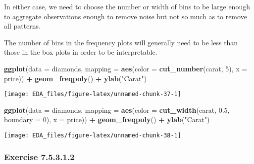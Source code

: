 \documentclass[]{book}
\newenvironment{Shaded}{\begin{snugshade}}{\end{snugshade}}
\newcommand{\DataTypeTok}[1]{\textcolor[rgb]{0.13,0.29,0.53}{#1}}
\newcommand{\DecValTok}[1]{\textcolor[rgb]{0.00,0.00,0.81}{#1}}
\newcommand{\FloatTok}[1]{\textcolor[rgb]{0.00,0.00,0.81}{#1}}
\newcommand{\KeywordTok}[1]{\textcolor[rgb]{0.13,0.29,0.53}{\textbf{#1}}}
\newcommand{\NormalTok}[1]{#1}
\newcommand{\OperatorTok}[1]{\textcolor[rgb]{0.81,0.36,0.00}{\textbf{#1}}}
\newcommand{\StringTok}[1]{\textcolor[rgb]{0.31,0.60,0.02}{#1}}
\theoremstyle{plain}
\theoremstyle{remark}
\begin{document}
In either case, we need to choose the number or width of bins to be
large enough to aggregate observations enough to remove noise but not so
much as to remove all patterns.

The number of bins in the frequency plots will generally need to be less
than those in the box plots in order to be interpretable.

\begin{Shaded}
\begin{Highlighting}[]
\KeywordTok{ggplot}\NormalTok{(}\DataTypeTok{data =}\NormalTok{ diamonds,}
       \DataTypeTok{mapping =} \KeywordTok{aes}\NormalTok{(}\DataTypeTok{color =} \KeywordTok{cut_number}\NormalTok{(carat, }\DecValTok{5}\NormalTok{), }\DataTypeTok{x =}\NormalTok{ price)) }\OperatorTok{+}
\StringTok{  }\KeywordTok{geom_freqpoly}\NormalTok{() }\OperatorTok{+}
\StringTok{  }\KeywordTok{ylab}\NormalTok{(}\StringTok{"Carat"}\NormalTok{)}
\end{Highlighting}
\end{Shaded}

\begin{center}\texttt{[image: EDA\_files/figure-latex/unnamed-chunk-37-1]} \end{center}

\begin{Shaded}
\begin{Highlighting}[]
\KeywordTok{ggplot}\NormalTok{(}\DataTypeTok{data =}\NormalTok{ diamonds,}
       \DataTypeTok{mapping =} \KeywordTok{aes}\NormalTok{(}\DataTypeTok{color =} \KeywordTok{cut_width}\NormalTok{(carat, }\FloatTok{0.5}\NormalTok{, }\DataTypeTok{boundary =} \DecValTok{0}\NormalTok{), }\DataTypeTok{x =}\NormalTok{ price)) }\OperatorTok{+}
\StringTok{  }\KeywordTok{geom_freqpoly}\NormalTok{() }\OperatorTok{+}
\StringTok{  }\KeywordTok{ylab}\NormalTok{(}\StringTok{"Carat"}\NormalTok{)}
\end{Highlighting}
\end{Shaded}

\begin{center}\texttt{[image: EDA\_files/figure-latex/unnamed-chunk-38-1]} \end{center}

\hypertarget{exercise-7.5.3.1.2}{%
\subsubsection*{\texorpdfstring{Exercise
{7.5.3.1.2}}{Exercise 7.5.3.1.2}}\label{exercise-7.5.3.1.2}}
\end{document}
